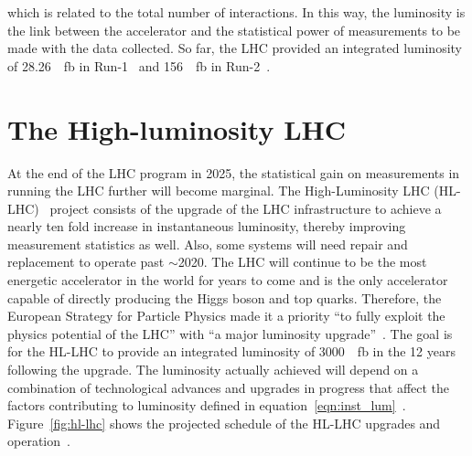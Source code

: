 which is related to the total number of interactions. In this way, the luminosity is the link between the accelerator and the statistical power of measurements to be made with the data collected. So far, the LHC provided an integrated luminosity of \SI{28.26}{\per\femto\barn} in Run-1~\cite{atlas_luminosity_run1} and \SI{156}{\per\femto\barn} in Run-2~\cite{atlas_luminosity_run2}.

\section{The High-luminosity LHC}
At the end of the LHC program in 2025, the statistical gain on measurements in running the LHC further will become marginal. The High-Luminosity LHC (HL-LHC)~\cite{hl_lhc_tdr} project consists of the upgrade of the LHC infrastructure to achieve a nearly ten fold increase in instantaneous luminosity, thereby improving measurement statistics as well. Also, some systems will need repair and replacement to operate past $\sim$2020. The LHC will continue to be the most energetic accelerator in the world for years to come and is the only accelerator capable of directly producing the Higgs boson and top quarks. Therefore, the European Strategy for Particle Physics made it a priority ``to fully exploit the physics potential of the LHC'' with ``a major luminosity upgrade''~\cite{european_strategy_for_particle_physics}. The goal is for the HL-LHC to provide an integrated luminosity of \SI{3000}{\per\femto\barn} in the 12 years following the upgrade. The luminosity actually achieved will depend on a combination of technological advances and upgrades in progress that affect the factors contributing to luminosity defined in equation~\ref{eqn:inst_lum}~\cite{hl_lhc_tdr}. Figure~\ref{fig:hl-lhc} shows the projected schedule of the HL-LHC upgrades and operation~\cite{hl-lhc_plan_picture_website}.

